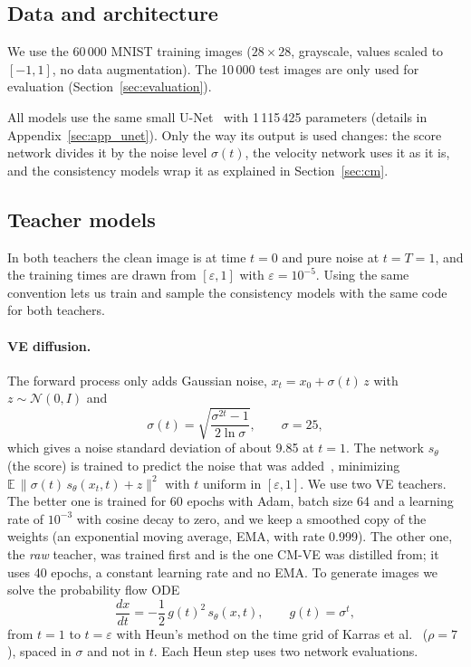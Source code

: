 \documentclass{article}
\begin{document}
\subsection{Data and architecture}
\label{sec:data}

We use the 60\,000 MNIST training images ($28\times28$, grayscale, values scaled
to $[-1, 1]$, no data augmentation). The 10\,000 test images are only used for
evaluation (Section~\ref{sec:evaluation}).

All models use the same small U-Net~\cite{ronneberger2015unet} with 1\,115\,425
parameters (details in Appendix~\ref{sec:app_unet}). Only the way its output is
used changes: the score network divides it by the noise level $\sigma(t)$, the
velocity network uses it as it is, and the consistency models wrap it as
explained in Section~\ref{sec:cm}.

\subsection{Teacher models}
\label{sec:teachers}

In both teachers the clean image is at time $t = 0$ and pure noise at
$t = T = 1$, and the training times are drawn from $[\varepsilon, 1]$ with
$\varepsilon = 10^{-5}$. Using the same convention lets us train and sample the
consistency models with the same code for both teachers.

\paragraph{VE diffusion.} The forward process only adds Gaussian noise,
$x_t = x_0 + \sigma(t)\,z$ with $z \sim \mathcal{N}(0, I)$ and
\begin{equation}
  \sigma(t) = \sqrt{\frac{\sigma^{2t} - 1}{2 \ln \sigma}}, \qquad \sigma = 25,
\end{equation}
which gives a noise standard deviation of about 9.85 at $t = 1$. The network
$s_\theta$ (the score) is trained to predict the noise that was
added~\cite{song2021sde}, minimizing
$\mathbb{E}\,\|\sigma(t)\, s_\theta(x_t, t) + z\|^2$ with $t$ uniform in
$[\varepsilon, 1]$. We use two VE teachers. The better one is trained for 60
epochs with Adam, batch size 64 and a learning rate of $10^{-3}$ with cosine
decay to zero, and we keep a smoothed copy of the weights (an exponential
moving average, EMA, with rate 0.999). The other one, the \emph{raw} teacher,
was trained first and is the one CM-VE was distilled from; it uses 40 epochs, a
constant learning rate and no EMA. To generate images we solve the probability
flow ODE
\begin{equation}
  \frac{dx}{dt} = -\frac{1}{2}\, g(t)^2\, s_\theta(x, t), \qquad g(t) = \sigma^t,
\end{equation}
from $t = 1$ to $t = \varepsilon$ with Heun's method on the time grid of Karras
et al.~\cite{karras2022edm} ($\rho = 7$), spaced in $\sigma$ and not in $t$. Each
Heun step uses two network evaluations.
\end{document}
